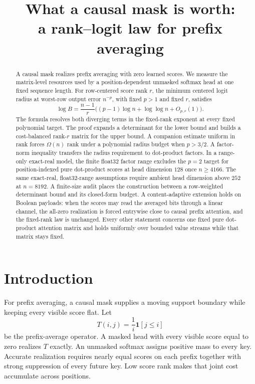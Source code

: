 \documentclass[10pt]{article}
\title{\vspace{-2.2em}\bfseries What a causal mask is worth:\\
a rank--logit law for prefix averaging}
\author{}
\date{}
\theoremstyle{definition}
\begin{document}
\maketitle
\vspace{-3.8em}

\begin{abstract}
A causal mask realizes prefix averaging with zero learned scores.  We measure
the matrix-level resources used by a position-dependent unmasked softmax head
at one fixed sequence length.  For row-centered score rank \(r\), the minimum
centered logit radius at worst-row output error \(n^{-p}\), with fixed \(p>1\)
and fixed \(r\), satisfies
\[
 \log B=\frac{n-1}{r}
 \bigl((p-1)\log n+\log\log n+O_{p,r}(1)\bigr).
\]
The formula resolves both diverging terms in the fixed-rank exponent at every
fixed polynomial target.  The proof expands a determinant for the lower bound and builds a
cost-balanced rank-\(r\) matrix for the upper bound.  A companion estimate
uniform in rank forces \(\Omega(n)\) rank under a polynomial radius budget when
\(p>3/2\).  A factor-norm inequality transfers the radius
requirement to dot-product factors.  In a range-only exact-real model, the
finite float32 factor range excludes the \(p=2\) target for position-indexed
pure dot-product scores at head dimension
\(128\) once \(n\ge4166\).  The same
exact-real, float32-range assumptions require ambient head dimension above
\(252\) at \(n=8192\).  A finite-size audit places the construction between a
row-weighted determinant bound and its closed-form budget.  A content-adaptive
extension holds on Boolean payloads: when the scores may read the averaged
bits through a linear channel, the all-zero realization is forced entrywise
close to causal prefix attention, and the fixed-rank law is unchanged.  Every
other statement
concerns one fixed pure dot-product attention matrix and holds uniformly over
bounded value streams while that matrix stays fixed.
\end{abstract}

\section{Introduction}

For prefix averaging, a causal mask supplies a moving support boundary while
keeping every visible score flat.  Let
\[
 T(i,j)=\frac1i\mathbf 1[j\le i]
\]
be the prefix-average operator.  A masked head with every visible score equal
to zero realizes \(T\) exactly.  An unmasked softmax assigns positive mass to
every key.  Accurate realization requires nearly equal scores on each prefix
together with strong suppression of every future key.  Low score rank makes
that joint cost accumulate across positions.
\end{document}
